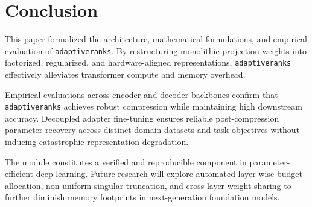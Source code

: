 \section{Conclusion}
This paper formalized the architecture, mathematical formulations, and empirical evaluation of \texttt{adaptiveranks}. By restructuring monolithic projection weights into factorized, regularized, and hardware-aligned representations, \texttt{adaptiveranks} effectively alleviates transformer compute and memory overhead.

Empirical evaluations across encoder and decoder backbones confirm that \texttt{adaptiveranks} achieves robust compression while maintaining high downstream accuracy. Decoupled adapter fine-tuning ensures reliable post-compression parameter recovery across distinct domain datasets and task objectives without inducing catastrophic representation degradation.

The module constitutes a verified and reproducible component in parameter-efficient deep learning. Future research will explore automated layer-wise budget allocation, non-uniform singular truncation, and cross-layer weight sharing to further diminish memory footprints in next-generation foundation models.
